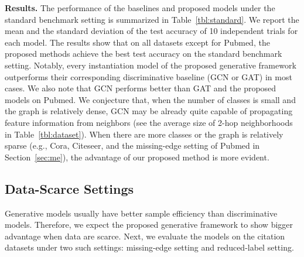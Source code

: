 \documentclass{article}
\newcommand{\vpara}[1]{\vspace{0.05in}\noindent\textbf{#1 }}
\begin{document}
\vpara{Results.}
The performance of the baselines and proposed models under the standard benchmark setting is summarized in Table~\ref{tbl:standard}. We report the mean and the standard deviation of the test accuracy of 10 independent trials for each model. The results show that on all datasets except for Pubmed, the proposed methods achieve the best test accuracy on the standard benchmark setting. Notably, every instantiation model of the proposed generative framework outperforms their corresponding discriminative baseline (GCN or GAT) in most cases. We also note that GCN performs better than GAT and the proposed models on Pubmed. We conjecture that, when the number of classes is small and the graph is relatively dense, GCN may be already quite capable of propagating feature information from neighbors (see the average size of 2-hop neighborhoods in Table~\ref{tbl:dataset}). When there are more classes or the graph is relatively sparse (e.g., Cora, Citeseer, and the missing-edge setting of Pubmed in Section~\ref{sec:me}), the advantage of our proposed method is more evident.



\subsection{Data-Scarce Settings}
Generative models usually have better sample efficiency than discriminative models. Therefore, we expect the proposed generative framework to show bigger advantage when data are scarce. Next, we evaluate the models on the citation datasets under two such settings: missing-edge setting and reduced-label setting. 
\end{document}

